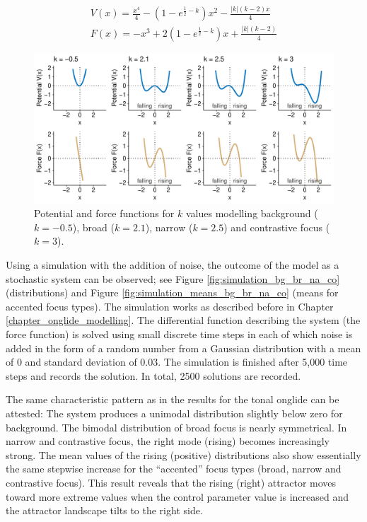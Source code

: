\begin{equation}
\begin{split}
V(x) = \frac{x^4}{4} - (1-e^{\frac{1}{2}-k})x^2 - \frac{|k|(k-2)x}{4} \\
F(x) = - x^3 + 2(1-e^{\frac{1}{2}-k})x + \frac{|k|(k-2)}{4}
\label{eq:onglide_model2}
\end{split}
\end{equation}

\begin{figure}
\includegraphics[width=\textwidth]{figures/ch7/potentials_force_model2.pdf}
\caption{Potential and force functions for $k$ values modelling background ($k=-0.5$), broad ($k=2.1$), narrow ($k=2.5$) and contrastive focus ($k=3$).}
\label{fig:potentials_force_bg_br_na_co}
\end{figure}

Using a simulation with the addition of noise, the outcome of the model as a stochastic system can be observed; see Figure \ref{fig:simulation_bg_br_na_co} (distributions) and Figure \ref{fig:simulation_means_bg_br_na_co} (means for accented focus types). The simulation works as described before in Chapter \ref{chapter_onglide_modelling}. The differential function describing the system (the force function) is solved using small discrete time steps in each of which noise is added in the form of a random number from a Gaussian distribution with a mean of $0$ and standard deviation of $0.03$. The simulation is finished after 5,000 time steps and records the solution. In total, 2500 solutions are recorded.

The same characteristic pattern as in the results for the tonal onglide can be attested: The system produces a unimodal distribution slightly below zero for background. The bimodal distribution of broad focus is nearly symmetrical. In narrow and contrastive focus, the right mode (rising) becomes increasingly strong. The mean values of the rising (positive) distributions also show essentially the same stepwise increase for the “accented” focus types (broad, narrow and contrastive focus). This result reveals that the rising (right) attractor moves toward more extreme values when the control parameter value is increased and the attractor landscape tilts to the right side.

